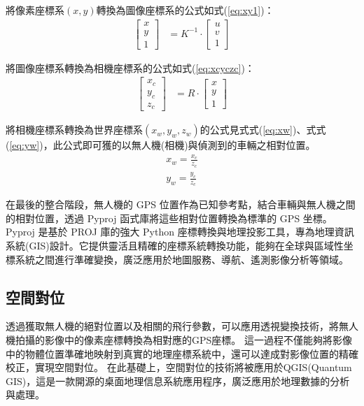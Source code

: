 \documentclass[12pt]{article}       %
\begin{document}
將像素座標系$(x,y)$轉換為圖像座標系的公式如式(\ref{eq:xy1})：
\begin{align}
    \begin{bmatrix}
        x       \\
        y    \\
        1        
    \end{bmatrix} 
     &=K^{-1}\cdot
     \begin{bmatrix}
        u       \\
        v       \\
        1        
    \end{bmatrix} 
    \label{eq:xy1}
\end{align}

將圖像座標系轉換為相機座標系的公式如式(\ref{eq:xcyczc})：
\begin{align}
    \begin{bmatrix}
        x_{c}   \\
        y_{c}   \\
        z_{c}        
    \end{bmatrix} 
     &=R\cdot
     \begin{bmatrix}
        x       \\
        y       \\
        1        
    \end{bmatrix} 
    \label{eq:xcyczc}
\end{align}

將相機座標系轉換為世界座標系$(x_{w},y_{w},z_{w})$的公式見式式(\ref{eq:xw})、式式(\ref{eq:yw})，此公式即可獲的以無人機(相機)與偵測到的車輛之相對位置。
\begin{align}
    x_{w}=\frac{x_{c}}{z_{c}}
    \label{eq:xw}\\
    y_{w}=\frac{y_{c}}{z_{c}}
    \label{eq:yw}
\end{align}

在最後的整合階段，無人機的 GPS 位置作為已知參考點，結合車輛與無人機之間的相對位置，透過 Pyproj 函式庫\cite{pyproj}將這些相對位置轉換為標準的 GPS 坐標。
Pyproj 是基於 PROJ 庫的強大 Python 座標轉換與地理投影工具，專為地理資訊系統(GIS)設計。它提供靈活且精確的座標系統轉換功能，能夠在全球與區域性坐標系統之間進行準確變換，廣泛應用於地圖服務、導航、遙測影像分析等領域。

\subsection{空間對位}
\hspace{2em}透過獲取無人機的絕對位置以及相關的飛行參數，可以應用透視變換技術，將無人機拍攝的影像中的像素座標轉換為相對應的GPS座標。
這一過程不僅能夠將影像中的物體位置準確地映射到真實的地理座標系統中，還可以達成對影像位置的精確校正，實現空間對位。
在此基礎上，空間對位的技術將被應用於QGIS(Quantum GIS)\cite{QGIS_software}，這是一款開源的桌面地理信息系統應用程序，廣泛應用於地理數據的分析與處理。
\end{document}
